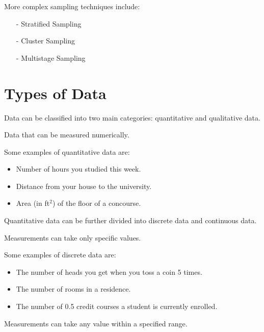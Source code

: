 \begin{nt}
More complex sampling techniques include:
	\begin{itemize}\justifying
	\item[-]	Stratified Sampling
	\item[-]	Cluster Sampling
	\item[-]	Multistage Sampling
	\end{itemize}
\end{nt}


\section{Types of Data}	

Data can be classified into two main categories: quantitative and qualitative data.

\begin{definition}	
Data that can be measured numerically.
\end{definition}

\noindent
Some examples of quantitative data are:

	\begin{itemize}
	\item	Number of hours you studied this week.
	\item	Distance from your house to the university.
	\item Area (in ft$^{2}$) of the floor of a concourse.
	\end{itemize}


\noindent
Quantitative data can be further divided into discrete data and continuous data.

\begin{definition}		
Measurements can take only specific values.
\end{definition}

\noindent
Some examples of discrete data are:
	\begin{itemize}
	\item	The number of heads you get when you toss a coin 5 times.
	\item	The number of rooms in a residence.
	\item   The number of 0.5 credit courses a student is currently enrolled.
	\end{itemize}


\begin{definition}	
Measurements can take any value within a specified range.
\end{definition}

